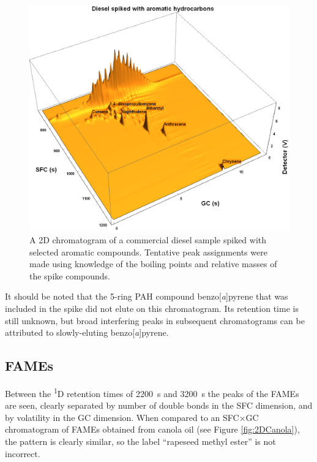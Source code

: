 \begin{figure}
	\centering
	\includegraphics[width=\textwidth]{Figures/Spiked_Diesel_Annotated.png}
	\decoRule	
	
\caption[Peak assignment in spiked diesel sample.]{A 2D chromatogram of a
commercial diesel sample spiked with selected aromatic compounds. Tentative peak
assignments were made using knowledge of the boiling points and relative masses
of the spike compounds.}

	\label{fig:Spiked_Diesel_Annotated} 
\end{figure}

It should be noted that the 5-ring PAH compound benzo[\textit{a}]pyrene that was
included in the spike did not elute on this chromatogram. Its retention time is
still unknown, but broad interfering peaks in subsequent chromatograms can be
attributed to slowly-eluting benzo[\textit{a}]pyrene.

\subsection{FAMEs}

Between the \textsuperscript{1}D retention times of \SI{2200}{\second} and
\SI{3200}{\second} the peaks of the FAMEs are seen, clearly separated by number
of double bonds in the SFC dimension, and by volatility in the GC dimension.
When compared to an SFC×GC chromatogram of FAMEs obtained from canola oil (see
Figure \ref{fig:2DCanola}), the pattern is clearly similar, so the label
``rapeseed methyl ester'' is not incorrect.

